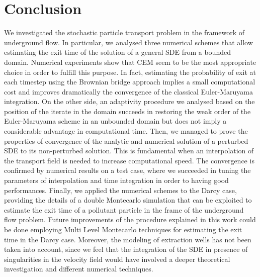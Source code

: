 \section{Conclusion}

We investigated the stochastic particle transport problem in the framework of underground flow. In particular, we analysed three numerical schemes that allow estimating the exit time of the solution of a general SDE from a bounded domain. Numerical experiments show that CEM seem to be the most appropriate choice in order to fulfill this purpose. In fact, estimating the probability of exit at each timestep using the Brownian bridge approach implies a small computational cost and improves dramatically the convergence of the classical Euler-Maruyama integration. On the other side, an adaptivity procedure we analysed based on the position of the iterate in the domain succeeds in restoring the weak order of the Euler-Maruyama scheme in an unbounded domain but does not imply a considerable advantage in computational time. Then, we managed to prove the properties of convergence of the analytic and numerical solution of a perturbed SDE to its non-perturbed solution. This is fundamental when an interpolation of the transport field is needed to increase computational speed. The convergence is confirmed by numerical results on a test case, where we succeeded in tuning the parameters of interpolation and time integration in order to having good performances. Finally, we applied the numerical schemes to the Darcy case, providing the details of a double Montecarlo simulation that can be exploited to estimate the exit time of a pollutant particle in the frame of the underground flow problem. Future improvements of the procedure explained in this work could be done employing Multi Level Montecarlo techniques for estimating the exit time in the Darcy case. Moreover, the modeling of extraction wells has not been taken into account, since we feel that the integration of the SDE in presence of singularities in the velocity field would have involved a deeper theoretical investigation and different numerical techniques.  
